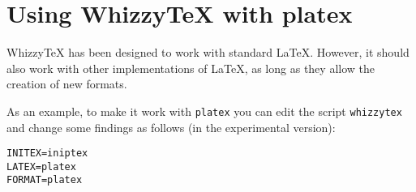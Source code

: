 \documentclass{article}
\let \lst \verb
\begin{document}
\section {Using WhizzyTeX with platex}

WhizzyTeX has been designed to work with standard LaTeX.
However, it should also work  with other implementations of LaTeX, as long
as they allow the creation of new formats. 

As an example, to make it work with \lst"platex" you can edit 
the script \lst"whizzytex" and change some findings as follows
(in the experimental version): 
\begin{verbatim}
INITEX=iniptex
LATEX=platex
FORMAT=platex
\end{verbatim}
\end{document}
